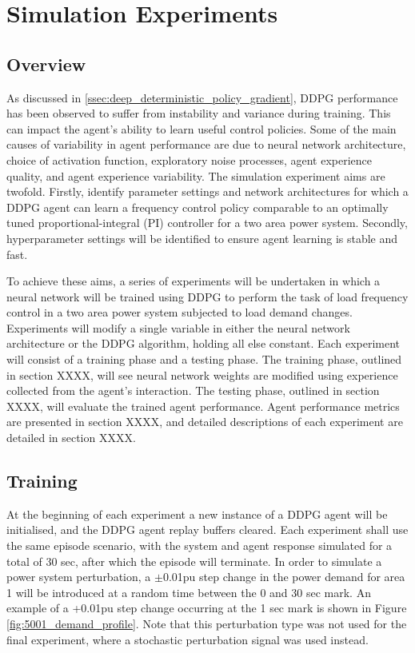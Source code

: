 \section{Simulation Experiments}\label{sec:simulation_experiments}
\subsection{Overview}
As discussed in \textsection \ref{ssec:deep_deterministic_policy_gradient}, DDPG performance has been observed to suffer from instability and variance during training. This can impact the agent's ability to learn useful control policies. Some of the main causes of variability in agent performance are due to neural network architecture, choice of activation function, exploratory noise processes, agent experience quality, and agent experience variability. The simulation experiment aims are twofold. Firstly, identify parameter settings and network architectures for which a DDPG agent can learn a frequency control policy comparable to an optimally tuned proportional-integral (PI) controller for a two area power system. Secondly, hyperparameter settings will be identified to ensure agent learning is stable and fast.

To achieve these aims, a series of experiments will be undertaken in which a neural network will be trained using DDPG to perform the task of load frequency control in a two area power system subjected to load demand changes. Experiments will modify a single variable in either the neural network architecture or the DDPG algorithm, holding all else constant. Each experiment will consist of a training phase and a testing phase. The training phase, outlined in section XXXX, will see neural network weights are modified using experience collected from the agent's interaction. The testing phase, outlined in section XXXX, will evaluate the trained agent performance. Agent performance metrics are presented in section XXXX, and detailed descriptions of each experiment are detailed in section XXXX.

\subsection{Training}\label{ssec:training}
At the beginning of each experiment a new instance of a DDPG agent will be initialised, and the DDPG agent replay buffers cleared. Each experiment shall use the same episode scenario, with the system and agent response simulated for a total of 30 sec, after which the episode will terminate. In order to simulate a power system perturbation, a $\pm$0.01pu step change in the power demand for area 1 will be introduced at a random time between the 0 and 30 sec mark. An example of a +0.01pu step change occurring at the 1 sec mark is shown in Figure \ref{fig:5001_demand_profile}. Note that this perturbation type was not used for the final experiment, where a stochastic perturbation signal was used instead.

